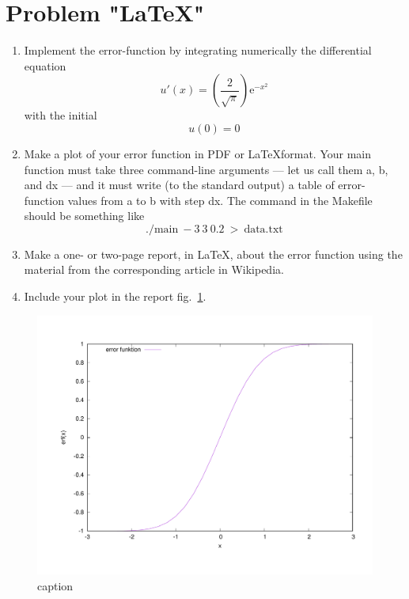 \documentclass{article}
\begin{document}
	\section{Problem "\LaTeX"}
	\begin{enumerate}
		\item Implement the error-function by integrating numerically the differential equation
		\[
			u'(x) = \left(\frac{2}{\sqrt{\pi}}\right) \mathrm{e}^{-x^2}
		\]
		with the initial
		\[
			u(0) = 0
        	\]
    		\item Make a plot of your error function in PDF or \LaTeX  format. Your main function must take three command-line arguments — let us call them a, b, and dx — and it must write (to the standard output) a table of error-function values from a to b with step dx. The command in the Makefile should be something like
		\[
			./\text{main} \ -3 \ 3 \ 0.2 \ > \ \text{data.txt}
		\]
		
		\item Make a one- or two-page report, in \LaTeX, about the error function using the material from the corresponding article in Wikipedia.
		\item Include your plot in the report fig.~\ref{fig:plot_error_function}.
	\end{enumerate}

	\begin{figure}[h]
		\centering
		\includegraphics[width=1\columnwidth]{plot.pdf}
		\caption{caption}
		\label{fig:plot_error_function}
	\end{figure}
\end{document}
